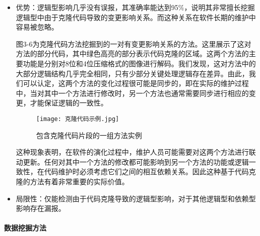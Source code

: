 \begin{itemize}

    \item 优势：逻辑型影响几乎没有误报，其准确率能达到95\%，说明其非常擅长挖掘逻辑型中由于克隆代码导致的变更影响关系。而这种关系在软件长期的维护中容易被忽略。

    图3-6为克隆代码方法挖掘到的一对有变更影响关系的方法。这里展示了这对方法的部分代码，其中绿色高亮的部分表示代码克隆的区域。这两个方法的主要功能是分别对8位和4位压缩格式的图像进行解码。我们发现，这对方法中的大部分逻辑结构几乎完全相同，只有少部分关键处理逻辑存在差异。由此，我们可以认定，这两个方法的变化过程很可能是同步的，即在实际的维护过程中，当对其中一个方法进行修改时，另一个方法也通常需要同步进行相应的变更，才能保证逻辑的一致性。

    \begin{figure}[h]
    \centering
    \texttt{[image: 克隆代码示例.jpg]}
    \caption{包含克隆代码片段的一组方法实例}
    \end{figure}

    这种现象表明，在软件的演化过程中，维护人员可能需要对这两个方法进行联动更新。任何对其中一个方法的修改都可能影响到另一个方法的功能或逻辑一致性，在代码维护时必须考虑它们之间的相互依赖关系。因此这种基于代码克隆的方法有着非常重要的实际价值。

    \item 局限性：仅能检测由于代码克隆导致的逻辑型影响，对于其他逻辑型和依赖型影响存在漏报。
    
\end{itemize}


\paragraph{数据挖掘方法}

